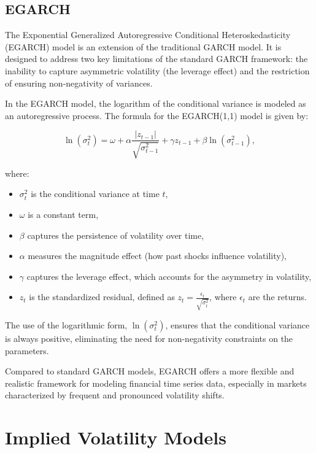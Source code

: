 \documentclass[letterpaper,11pt]{article}
\begin{document}
\subsection{EGARCH}

The Exponential Generalized Autoregressive Conditional Heteroskedasticity (EGARCH) model is an extension of the traditional GARCH model. It is designed to address two key limitations of the standard GARCH framework: the inability to capture asymmetric volatility (the leverage effect) and the restriction of ensuring non-negativity of variances.

In the EGARCH model, the logarithm of the conditional variance is modeled as an autoregressive process. The formula for the EGARCH(1,1) model is given by:

\[
\ln(\sigma_t^2) = \omega + \alpha \frac{|z_{t-1}|}{\sqrt{\sigma_{t-1}^2}} + \gamma z_{t-1} + \beta \ln(\sigma_{t-1}^2),
\]

where:
\begin{itemize}
    \item \( \sigma_t^2 \) is the conditional variance at time \( t \),
    \item \( \omega \) is a constant term,
    \item \( \beta \) captures the persistence of volatility over time,
    \item \( \alpha \) measures the magnitude effect (how past shocks influence volatility),
    \item \( \gamma \) captures the leverage effect, which accounts for the asymmetry in volatility,
    \item \( z_t \) is the standardized residual, defined as \( z_t = \frac{\epsilon_t}{\sqrt{\sigma_t^2}} \), where \( \epsilon_t \) are the returns.
\end{itemize}

The use of the logarithmic form, \( \ln(\sigma_t^2) \), ensures that the conditional variance is always positive, eliminating the need for non-negativity constraints on the parameters.

Compared to standard GARCH models, EGARCH offers a more flexible and realistic framework for modeling financial time series data, especially in markets characterized by frequent and pronounced volatility shifts.



\newpage


\section{Implied Volatility Models}
\end{document}
